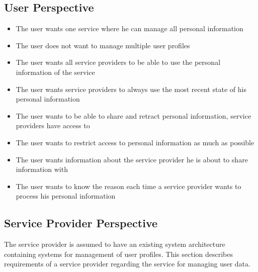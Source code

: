 \subsection{User Perspective}

\begin{itemize}
    \item The user wants one service where he can manage all personal information 
    
    \item The user does not want to manage multiple user profiles
    
    \item The user wants all service providers to be able to use the personal information of the service
    
    \item The user wants service providers to always use the most recent state of his personal information
    
    \item The user wants to be able to share and retract personal information, service providers have access to
    
    \item The user wants to restrict access to personal information as much as possible
    
    \item The user wants information about the service provider he is about to share information with
    
    \item The user wants to know the reason each time a service provider wants to process his personal information
    
\end{itemize}

\subsection{Service Provider Perspective}

The service provider is assumed to have an existing system architecture containing systems for management of user profiles. This section describes requirements of a service provider regarding the service for managing user data.


